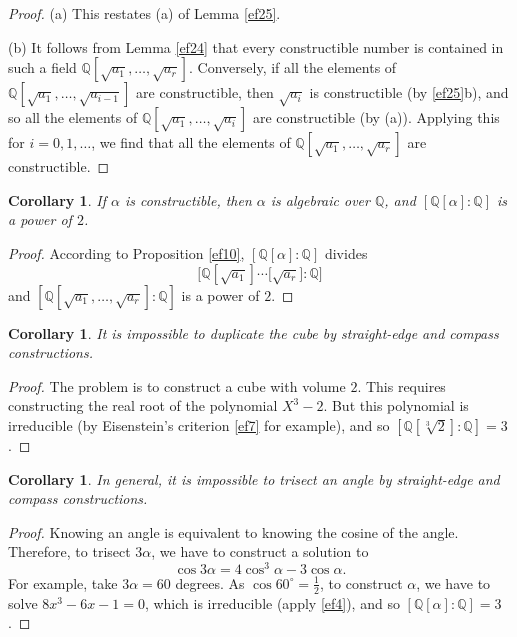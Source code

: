 \documentclass[a4paper,11pt,final,openany]{memoir}
\newtheorem{corollary}[X]{Corollary}
\theoremstyle{nonumberplain}
\newtheorem{proof}{Proof.}
\begin{document}
\begin{proof}
(a) This restates (a) of Lemma \ref{ef25}.

(b) It follows from Lemma \ref{ef24} that every constructible number is
contained in such a field $\mathbb{Q}{}[\sqrt{a_{1}},\ldots,\sqrt{a_{r}}]$.
Conversely, if all the elements of $\mathbb{Q}{}[\sqrt{a_{1}},\ldots
,\sqrt{a_{i-1}}]$ are constructible, then $\sqrt{a_{i}}$ is constructible (by
\ref{ef25}b), and so all the elements of $\mathbb{Q}{}[\sqrt{a_{1}}%
,\ldots,\sqrt{a_{i}}]$ are constructible (by (a)). Applying this for
$i=0,1,\ldots$, we find that all the elements of $\mathbb{Q}{}[\sqrt{a_{1}%
},\ldots,\sqrt{a_{r}}]$ are constructible.
\end{proof}

\begin{corollary}
\label{ef27}If $\alpha$ is constructible, then $\alpha$ is algebraic over
$\mathbb{Q}$, and $[\mathbb{Q}[\alpha]\colon\mathbb{Q}]$ is a power of $2$.
\end{corollary}

\begin{proof}
According to Proposition \ref{ef10}, $[\mathbb{Q}[\alpha]\colon\mathbb{Q}]$
divides
\[
\lbrack\mathbb{Q}[\sqrt{a_{1}}]\cdots\lbrack\sqrt{a_{r}}]\colon\mathbb{Q}]
\]
and $[\mathbb{Q}[\sqrt{a_{1}},\ldots,\sqrt{a_{r}}]\colon\mathbb{Q}]$ is a
power of $2$.
\end{proof}

\begin{corollary}
\label{ef28}It is impossible to duplicate the cube by straight-edge and
compass constructions.
\end{corollary}

\begin{proof}
The problem is to construct a cube with volume $2$. This requires constructing
the real root of the polynomial $X^{3}-2$. But this polynomial is irreducible
(by Eisenstein's criterion \ref{ef7} for example), and so $[\mathbb{Q}%
[\sqrt[3]{2}]\colon\mathbb{Q}]=3$.
\end{proof}

\begin{corollary}
\label{ef29}In general, it is impossible to trisect an angle by straight-edge
and compass constructions.
\end{corollary}

\begin{proof}
Knowing an angle is equivalent to knowing the cosine of the angle. Therefore,
to trisect $3\alpha$, we have to construct a solution to
\[
\cos3\alpha=4\cos^{3}\alpha-3\cos\alpha.
\]
For example, take $3\alpha=60$ degrees. As $\cos60^{\circ}=\frac{1}{2}$, to
construct $\alpha$, we have to solve $8x^{3}-6x-1=0$, which is irreducible
(apply \ref{ef4}), and so $[\mathbb{Q}{}[\alpha]\colon\mathbb{Q}{}]=3$.
\end{proof}
\end{document}
